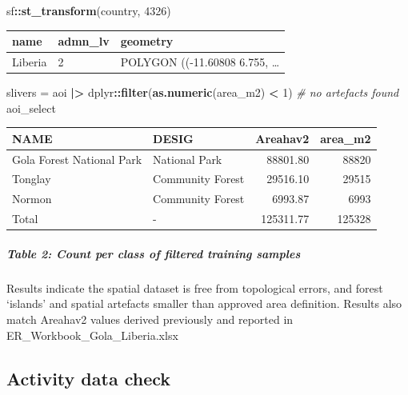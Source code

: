 \documentclass[
]{article}
\newenvironment{Shaded}{\begin{snugshade}}{\end{snugshade}}
\newcommand{\CommentTok}[1]{\textcolor[rgb]{0.56,0.35,0.01}{\textit{#1}}}
\newcommand{\DecValTok}[1]{\textcolor[rgb]{0.00,0.00,0.81}{#1}}
\newcommand{\FunctionTok}[1]{\textcolor[rgb]{0.13,0.29,0.53}{\textbf{#1}}}
\newcommand{\NormalTok}[1]{#1}
\newcommand{\OtherTok}[1]{\textcolor[rgb]{0.56,0.35,0.01}{#1}}
\newcommand{\SpecialCharTok}[1]{\textcolor[rgb]{0.81,0.36,0.00}{\textbf{#1}}}
\begin{document}
\begin{Shaded}
\begin{Highlighting}[]
\NormalTok{sf}\SpecialCharTok{::}\FunctionTok{st\_transform}\NormalTok{(country, }\DecValTok{4326}\NormalTok{) }
\end{Highlighting}
\end{Shaded}

\begin{longtable}[]{@{}lll@{}}
\toprule\noalign{}
name & admn\_lv & geometry \\
\midrule\noalign{}
\endhead
\bottomrule\noalign{}
\endlastfoot
Liberia & 2 & POLYGON ((-11.60808 6.755, \ldots{} \\
\end{longtable}

\begin{Shaded}
\begin{Highlighting}[]
\NormalTok{slivers }\OtherTok{=}\NormalTok{ aoi }\SpecialCharTok{|\textgreater{}}\NormalTok{ dplyr}\SpecialCharTok{::}\FunctionTok{filter}\NormalTok{(}\FunctionTok{as.numeric}\NormalTok{(area\_m2) }\SpecialCharTok{\textless{}} \DecValTok{1}\NormalTok{)  }\CommentTok{\# no artefacts found}
\NormalTok{aoi\_select}
\end{Highlighting}
\end{Shaded}

\begin{longtable}[]{@{}llrr@{}}
\toprule\noalign{}
NAME & DESIG & Areahav2 & area\_m2 \\
\midrule\noalign{}
\endhead
\bottomrule\noalign{}
\endlastfoot
Gola Forest National Park & National Park & 88801.80 & 88820 \\
Tonglay & Community Forest & 29516.10 & 29515 \\
Normon & Community Forest & 6993.87 & 6993 \\
Total & - & 125311.77 & 125328 \\
\end{longtable}

\subparagraph{Table 2: Count per class of filtered training
samples}\label{table-2-count-per-class-of-filtered-training-samples}

Results indicate the spatial dataset is free from topological errors,
and forest `islands' and spatial artefacts smaller than approved area
definition. Results also match Areahav2 values derived previously and
reported in ER\_Workbook\_Gola\_Liberia.xlsx

\subsection{Activity data check}\label{activity-data-check}
\end{document}
